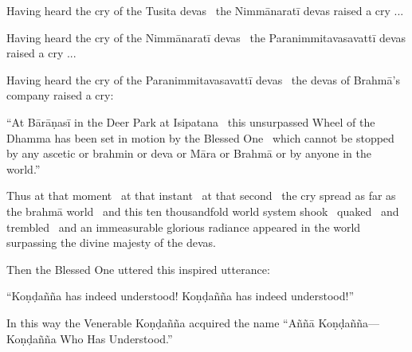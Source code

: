 \medskip

\begin{english-hang}
  Having heard the cry of the Tusita devas \breathmark\ the Nimmānaratī devas raised a cry ...
\end{english-hang}

\medskip

\begin{english-hang}
  Having heard the cry of the Nimmānaratī devas \breathmark\ the Paranimmitavasavattī devas raised a cry ...
\end{english-hang}

\medskip

\begin{english-hang}
  Having heard the cry of the Paranimmitavasavattī devas \breathmark\ the devas of Brahmā's company raised a cry:
\end{english-hang}

\medskip

\begin{english-hang}
  ``At Bārāṇasī in the Deer Park at Isipatana \breathmark\ this unsurpassed Wheel of the Dhamma has been set in motion by the Blessed One \breathmark\ which cannot be stopped by any ascetic or brahmin or deva or Māra or Brahmā or by anyone in the world.''
\end{english-hang}

\medskip

\begin{english-hang}
  Thus at that moment \breathmark\ at that instant \breathmark\ at that second \breathmark\ the cry spread as far as the brahmā world \breathmark\ and this ten thousandfold world system shook \breathmark\ quaked \breathmark\ and trembled \breathmark\ and an immeasurable glorious radiance appeared in the world surpassing the divine majesty of the devas.
\end{english-hang}

\medskip

\begin{english-hang}
  Then the Blessed One uttered this inspired utterance:
\end{english-hang}

\medskip

\begin{english-hang}
  ``Koṇḍañña has indeed understood! Koṇḍañña has indeed understood!''
\end{english-hang}

\medskip

\begin{english-hang}
  In this way the Venerable Koṇḍañña acquired the name ``Aññā Koṇḍañña—Koṇḍañña Who Has Understood.''
\end{english-hang}

\suttaRef{[SN 56.11]}
